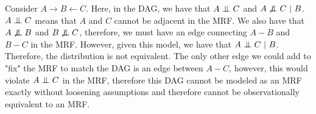 \tffalse

Consider $A \rightarrow B \leftarrow C$. 
Here, in the DAG, we have that $A \mathrel{\perp\mkern-10mu\perp} C$ and $A \not\mathrel{\perp\mkern-10mu\perp} C ~\vert~ B$. $A \mathrel{\perp\mkern-10mu\perp} C$ means that $A$ and $C$ cannot be adjacent in the MRF. We also have that $A \not\mathrel{\perp\mkern-10mu\perp} B$ and $B \not\mathrel{\perp\mkern-10mu\perp} C$, therefore, we must have an edge connecting $A-B$ and $B-C$ in the MRF. However, given this model, we have that $A \mathrel{\perp\mkern-10mu\perp} C ~\vert~ B$. Therefore, the distribution is not equivalent. The only other edge we could add to "fix" the MRF to match the DAG is an edge between $A-C$, however, this would violate $A \mathrel{\perp\mkern-10mu\perp} C$ in the MRF, therefore this DAG cannot be modeled as an MRF exactly without loosening assumptions and therefore cannot be observationally equivalent to an MRF.
